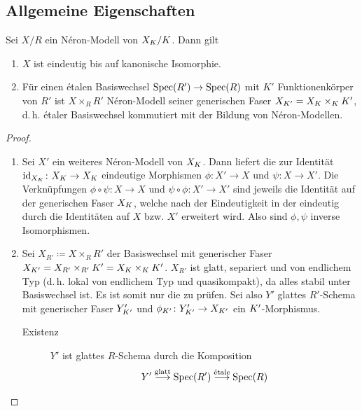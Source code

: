 \documentclass[german]{scrreprt}
\begin{document}
\subsection{Allgemeine Eigenschaften}
\begin{Satz}
  Sei $X/R$ ein Néron-Modell von $X_{K}/K$. Dann gilt
  \begin{enumerate}[label=(\roman*)]
  \item $X$ ist eindeutig bis auf kanonische Isomorphie.
  \item Für einen étalen Basiswechsel $\operatorname{Spec}(R')\to\operatorname{Spec}(R)$ mit $K'$
    Funktionenkörper von $R'$ ist $X\times_R R'$ Néron-Modell
    seiner generischen Faser $X_{K'}=X_{K}\times_{K}K'$,
    d.\,h. étaler Basiswechsel kommutiert mit der Bildung von
    Néron-Modellen.
  \end{enumerate}
  \begin{proof}
    \begin{enumerate}[label=(\roman*)]
    \item Sei $X'$ ein weiteres Néron-Modell von $X_{K}$.
      Dann liefert die \NAbbEig zur Identität
      $\mathrm{id}_{X_{K}}\colon X_{K}\to X_{K}$ eindeutige Morphismen
      $\phi\colon X'\to X$ und $\psi\colon X\to X'$.
      Die Verknüpfungen $\phi\circ\psi\colon X\to X$ und
      $\psi\circ\phi\colon X'\to X'$ sind jeweils die Identität auf
      der generischen Faser $X_{K}$, welche nach der Eindeutigkeit in der
      \NAbbEig eindeutig durch die Identitäten auf
      $X$ bzw. $X'$ erweitert wird. Also sind $\phi,\psi$ inverse
      Isomorphismen.
    \item
      Sei $X_{R'}\coloneqq X\times_R R'$ der Basiswechsel
      mit generischer Faser
      $X_{K'}=X_{R'}\times_{R'}K'=X_{K}\times_{K}K'$.
      $X_{R'}$ ist glatt, separiert und von endlichem Typ 
      (d.\,h. lokal von endlichem Typ und quasikompakt), da alles
      stabil unter Basiswechsel ist. Es ist somit nur die
      \NAbbEig zu prüfen.
      Sei also $Y'$ glattes $R'$-Schema mit generischer Faser
      $Y_{K'}'$ und $\phi_{K'}\colon Y_{K'}'\to X_{K'}$ ein
      $K'$-Morphismus. 
      \begin{description}
      \item[Existenz] 
        $Y'$ ist glattes $R$-Schema durch die Komposition
        \begin{gather*}
          Y'\overset{\text{glatt}}{\longrightarrow}\operatorname{Spec}(R')
          \overset{\text{étale}}{\longrightarrow}\operatorname{Spec}(R)
        \end{gather*}

\end{description}
\end{enumerate}
\end{proof}
\end{Satz}
\end{document}
